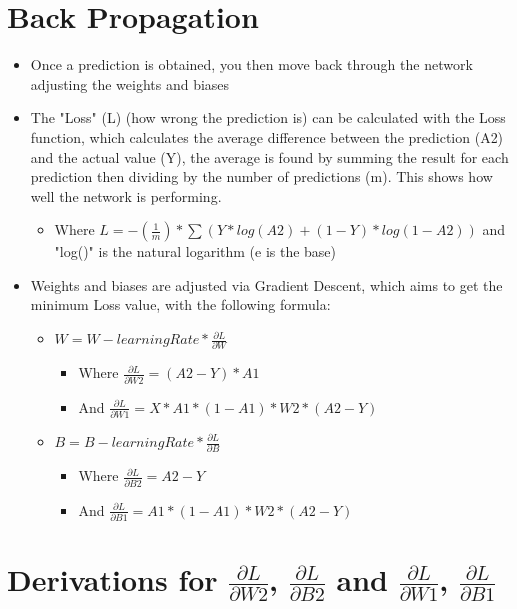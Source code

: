 \documentclass[10pt,a4paper]{article}
\begin{document}
\section{Back Propagation}

\begin{itemize}
    \item Once a prediction is obtained, you then move back through the network adjusting the weights and biases
    \item The "Loss" (L) (how wrong the prediction is) can be calculated with the Loss function, which calculates the average difference between the prediction (A2) and the actual value (Y), the average is found by summing the result for each prediction then dividing by the number of predictions (m). This shows how well the network is performing.
    \begin{itemize}
        \item Where $L = -(\frac{1}{m}) * \sum(Y * log(A2) + (1-Y) * log(1-A2))$ and "log()" is the natural logarithm (e is the base)
    \end{itemize}
    \item Weights and biases are adjusted via Gradient Descent, which aims to get the minimum Loss value, with the following formula:
    \begin{itemize}
        \item $W = W - learningRate * \frac{\partial{L}}{\partial{W}}$
        \begin{itemize}
            \item Where $\frac{\partial{L}}{\partial{W2}} = (A2-Y) * A1$
            \item And $\frac{\partial{L}}{\partial{W1}} = X * A1 * (1-A1) * W2 * (A2-Y)$
        \end{itemize}
        \item $B = B - learningRate * \frac{\partial{L}}{\partial{B}}$
        \begin{itemize}
            \item Where $\frac{\partial{L}}{\partial{B2}} = A2-Y$
            \item And $\frac{\partial{L}}{\partial{B1}} = A1 * (1-A1) * W2 * (A2-Y)$
        \end{itemize}
    \end{itemize}
\end{itemize}

\section{Derivations for $\frac{\partial{L}}{\partial{W2}}$, $\frac{\partial{L}}{\partial{B2}}$ and $\frac{\partial{L}}{\partial{W1}}$, $\frac{\partial{L}}{\partial{B1}}$}
\end{document}
